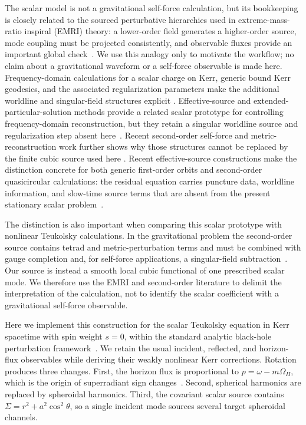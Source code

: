 \documentclass[aps,prd,twocolumn,10pt,nofootinbib,superscriptaddress,floatfix]{revtex4-2}
\begin{document}
The scalar model is not a gravitational self-force calculation, but its
bookkeeping is closely related to the sourced perturbative hierarchies used in
extreme-mass-ratio inspiral (EMRI) theory: a lower-order field generates a
higher-order source, mode coupling must be projected consistently, and
observable fluxes provide an important global check~\cite{BarackPound2019,
PoundWardell2021,Ripley2021}.  We use this analogy only to motivate the
workflow; no claim about a gravitational waveform or a self-force observable
is made here.  Frequency-domain calculations for a scalar charge on Kerr,
generic bound Kerr geodesics, and the associated regularization parameters
make the additional worldline and singular-field structures explicit
\cite{WarburtonBarack2011,vanDeMeent2017,Heffernan2022}.  Effective-source
and extended-particular-solution methods provide a related scalar prototype
for controlling frequency-domain reconstruction, but they retain a singular
worldline source and regularization step absent here~\cite{LeatherWarburton2023}.
Recent second-order
self-force and metric-reconstruction work further shows why those structures
cannot be replaced by the finite cubic source used here
\cite{Wei2025,Berens2024}.  Recent effective-source constructions make the
distinction concrete for both generic first-order orbits and second-order
quasicircular calculations: the residual equation carries puncture data,
worldline information, and slow-time source terms that are absent from the
present stationary scalar problem~\cite{ZhangEffectiveSource2025,
UptonWardell2026}.

The distinction is also important when comparing this scalar prototype with
nonlinear Teukolsky calculations.  In the gravitational problem the
second-order source contains tetrad and metric-perturbation terms and must be
combined with gauge completion and, for self-force applications, a
singular-field subtraction~\cite{GreenHollandsZimmerman,SpiersPoundMoxon,
SpiersSource2024}.  Our source is instead a smooth local cubic functional of
one prescribed scalar mode.  We therefore use the EMRI and second-order
literature to delimit the interpretation of the calculation, not to identify
the scalar coefficient with a gravitational self-force observable.

Here we implement this construction for the scalar Teukolsky equation in Kerr
spacetime with spin weight $s=0$, within the standard analytic black-hole
perturbation framework~\cite{SasakiTagoshi}.  We retain the usual incident,
reflected, and horizon-flux observables while deriving their weakly nonlinear
Kerr corrections.  Rotation produces three changes.  First, the horizon flux is proportional to
$p=\omega-m\Omega_H$, which is the origin of superradiant sign
changes~\cite{StarobinskyChurilov,PressTeukolsky}.  Second, spherical
harmonics are replaced by spheroidal harmonics.  Third, the covariant scalar
source contains $\Sigma=r^2+a^2\cos^2\theta$, so a single incident mode sources
several target spheroidal channels.
\end{document}
